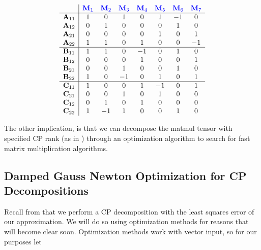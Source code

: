 \begin{multicols}{2}
        \setlength{\arraycolsep}{3pt}
        \[\begin{array}{c|ccccccc}
            & \color{blue} \mathbf{M}_1 & \color{blue} \mathbf{M}_2 & \color{blue} \mathbf{M}_3 & \color{blue} \mathbf{M}_4 & \color{blue} \mathbf{M}_5 & \color{blue} \mathbf{M}_6 & \color{blue} \mathbf{M}_7 \\
            \hline
            \mathbf{A}_{11} & 1 & 0 & 1 & 0 & 1 & -1 & 0 \\
            \mathbf{A}_{12} & 0 & 1 & 0 & 0 & 0 & 1 & 0 \\
            \mathbf{A}_{21} & 0 & 0 & 0 & 0 & 1 & 0 & 1 \\
            \mathbf{A}_{22} & 1 & 1 & 0 & 1 & 0 & 0 & -1 \\
            \hline
            \mathbf{B}_{11} & 1 & 1 & 0 & -1 & 0 & 1 & 0 \\
            \mathbf{B}_{12} & 0 & 0 & 0 & 1 & 0 & 0 & 1 \\
            \mathbf{B}_{21} & 0 & 0 & 1 & 0 & 0 & 1 & 0 \\
            \mathbf{B}_{22} & 1 & 0 & -1 & 0 & 1 & 0 & 1 \\
            \hline
            \mathbf{C}_{11} & 1 & 0 & 0 & 1 & -1 & 0 & 1 \\
            \mathbf{C}_{21} & 0 & 0 & 1 & 0 & 1 & 0 & 0 \\
            \mathbf{C}_{12} & 0 & 1 & 0 & 1 & 0 & 0 & 0 \\
            \mathbf{C}_{22} & 1 & -1 & 1 & 0 & 0 & 1 & 0 \\
    \end{array}\]
    \end{multicols}
    
    
    The other implication, is that we can decompose the matmul tensor with
    specified CP rank (as in ) through an optimization algorithm
    to search for fast matrix multiplication algorithms.






\subsection{Damped Gauss Newton Optimization for CP Decompositions}\label{sec:Damped Gauss Newton Optimization for CP Decompositions}
    
    Recall from  that we perform a CP decomposition
    with the least squares error of our approximation. We will do so using
    optimization methods for reasons that will become clear soon. Optimization
    methods work with vector input, so for our purposes let 

